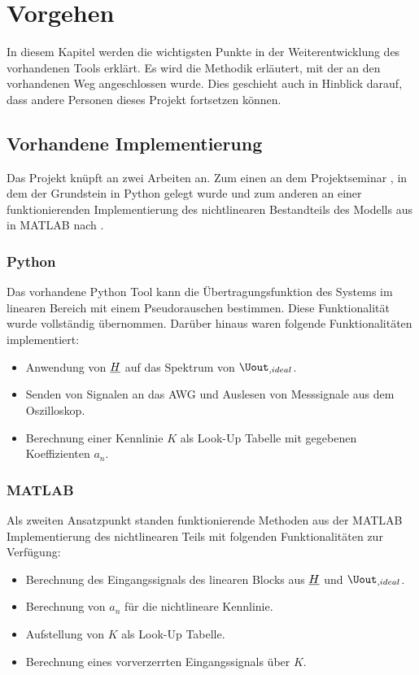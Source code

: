 \documentclass[../Report.tex]{subfiles}
\begin{document}
\chapter{Vorgehen}
\label{chap:vorgehen}
In diesem Kapitel werden die wichtigsten Punkte in der Weiterentwicklung des vorhandenen Tools erklärt. Es wird die Methodik erläutert, mit der an den vorhandenen Weg angeschlossen wurde. Dies geschieht auch in Hinblick darauf, dass andere Personen dieses Projekt fortsetzen können.
\section[Vorhandene Implementierung]{Vorhandene Implementierung}
\label{sec:vorg.setup}
Das Projekt knüpft an zwei Arbeiten an. Zum einen an dem Projektseminar \cite{PJS_Denys}, in dem der Grundstein in Python gelegt wurde und zum anderen an einer funktionierenden Implementierung des nichtlinearen Bestandteils des Modells aus  in MATLAB nach \cite{harzheim}.
\subsection{Python}
\label{sec:vorg.python}
Das vorhandene Python Tool \cite{PJS_Denys} kann die Übertragungsfunktion des Systems im linearen Bereich mit einem Pseudorauschen bestimmen. Diese Funktionalität wurde vollständig übernommen. Darüber hinaus waren folgende Funktionalitäten implementiert:
\begin{itemize}
	\item	Anwendung von $\underline{H}$ auf das Spektrum von $\Uout_{,ideal}$.
	
	\item	Senden von Signalen an das AWG und Auslesen von Messsignale aus dem Oszilloskop.
	
	\item	Berechnung einer Kennlinie $K$ als Look-Up Tabelle mit gegebenen Koeffizienten $a_n$.
\end{itemize}
\subsection{MATLAB}
\label{sec:vorg.matlab}
Als zweiten Ansatzpunkt standen funktionierende Methoden aus der MATLAB Implementierung des nichtlinearen Teils mit folgenden Funktionalitäten zur Verfügung:
\begin{itemize}
	\item	Berechnung des Eingangssignals des linearen Blocks aus $\underline{H}$ und $\Uout_{,ideal}$.
	
	\item	Berechnung von $a_n$ für die nichtlineare Kennlinie.
	
	\item	Aufstellung von $K$ als Look-Up Tabelle.
	
	\item	Berechnung eines vorverzerrten Eingangssignals über $K$.
\end{itemize}
\end{document}
